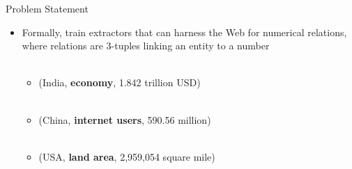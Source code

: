 \documentclass{beamer}
\begin{document}

% 
%  
% 
% 
% 
% 

\begin{frame}{Problem Statement}
\begin{itemize}
 \item Formally, train extractors that can harness the Web for numerical relations, where relations are 3-tuples linking an entity
to a number \\~\\
   
    \begin{itemize}
	\item  (India, \textbf{economy}, 1.842 trillion USD) \\~\\
	\item  (China, \textbf{internet users},  590.56 million) \\~\\
	\item  (USA, \textbf{land area}, 2,959,054 square mile)
    \end{itemize}

 \end{itemize}
\end{frame}
\end{document}
